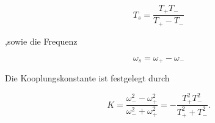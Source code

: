 \begin{equation*}
T_s=\frac{T_{+} T_{-}}{T_{+}-T_{-}}
\end{equation*}

,sowie die Frequenz

\begin{equation*}
\omega_s=\omega_{+}-\omega_{-}
\end{equation*}

Die Kooplungskonstante ist festgelegt durch

\begin{equation*}
K=\frac{\omega^2_{-} -\omega^2_{+}}{\omega^2_{-} +\omega^2_{+}}
=-\frac{T^2_{+}T^2_{-}}{T^2_{+}+T^2_{-}}.
\end{equation*}



